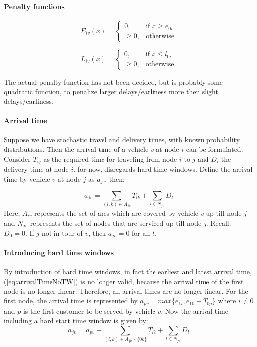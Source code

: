 \documentclass[a4paper,10pt,twoside]{report}
\begin{document}
\paragraph*{Penalty functions}
\begin{equation*}
E_{iv}(x)=
\begin{cases}
0, & \text{if } x \geq e_{0i} \\
\geq 0, & \text{otherwise}
\end{cases}
\end{equation*}

\begin{equation*}
L_{iv}(x)=
\begin{cases}
0, & \text{if } x \leq l_{0i} \\
\geq 0, & \text{otherwise}
\end{cases}
\end{equation*}

The actual penalty function has not been decided, but is probably some quadratic function, to penalize larger delays/earliness more then slight delays/earliness.

\paragraph*{Arrival time}
Suppose we have stochastic travel and delivery times, with known probability distributions. Then the arrival time of a vehicle $v$ at node $i$ can be formulated. Consider $T_{ij}$ as the required time for traveling from node $i$ to $j$ and $D_i$ the delivery time at node $i$. for now, disregards hard time windows. Define the arrival time by vehicle $v$ at node $j$ \textit{}as $a_{jv}$, then:

\begin{equation} \label{eq:arrivalTimeNoTW}
a_{jv} = \displaystyle\sum_{(l,k) \in A_{jv}} T_{lk} + \displaystyle\sum_{l \in N_{jv}} D_l
\end{equation}
Here, $A_{iv}$ represents the set of arcs which are covered by vehicle $v$ up till node $j$ and $N_{jv}$ represents the set of nodes that are serviced up till node $j$. Recall: $D_0 = 0$. If $j$ not in tour of $v$, then $a_{jv} = 0$ for all $t$.

\paragraph{Introducing hard time windows} By introduction of hard time windows, in fact the earliest and latest arrival time, (\ref{eq:arrivalTimeNoTW}) is no longer valid, because the arrival time of the first node is no longer linear. Therefore, all arrival times are no longer linear. For the first node, the arrival time is represented by $a_{pv} = max\{e_{1i}, e_{10}+T_{0p}\}$ where $i \neq 0$ and $p$ is the first customer to be served by vehicle $v$. Now the arrival time including a hard start time window is given by:
\begin{equation*} 
a_{jv} = a_{pv} + \displaystyle\sum_{(l,k) \in A_{jv}\backslash\{0k\}} T_{lk} + \displaystyle\sum_{l \in N_{jv}} D_l
\end{equation*}
\end{document}
